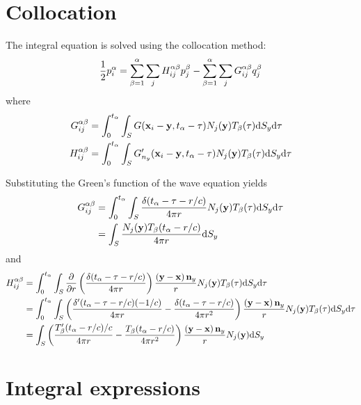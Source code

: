 \documentclass[a4paper,11pt,twoside]{article}
\newcommand{\td}{\mathrm{d}}
\begin{document}
\section{Collocation}

The integral equation is solved using the collocation method:
%
\begin{equation}
\frac{1}{2}p_{i}^{\alpha} =
\sum_{\beta = 1}^{\alpha} \sum_j 
H_{ij}^{\alpha \beta}
p^{\beta}_{j} \\
-
\sum_{\beta = 1}^{\alpha} \sum_j 
G_{ij}^{\alpha \beta}
q^{\beta}_{j} 
\end{equation}
%
where
%
\begin{align}
G_{ij}^{\alpha \beta} &=
\int_{0}^{t_{\alpha}} \int_{S}
G({\bf x}_i-{\bf y}, t_{\alpha}-\tau)
N_j({\bf y}) T_{\beta}(\tau)
\td S_{y} \td \tau
\nonumber \\
H_{ij}^{\alpha \beta} &=
\int_{0}^{t_{\alpha}} \int_{S}
G'_{n_y}({\bf x}_i-{\bf y}, t_{\alpha}-\tau)
N_j({\bf y}) T_{\beta}(\tau)
\td S_{y} \td \tau
\end{align}

Substituting the Green's function of the wave equation yields
%
\begin{align}
G_{ij}^{\alpha \beta}
&=
\int_{0}^{t_{\alpha}} \int_{S}
\frac{\delta(t_{\alpha}-\tau-r/c)}{4\pi r}
N_j({\bf y}) T_{\beta}(\tau)
\td S_{y} \td \tau
\nonumber \\
&=
\int_{S}
\frac{N_j({\bf y}) T_{\beta}(t_{\alpha}-r/c)}{4\pi r}
\td S_{y}
\end{align}
%
and
%
\begin{align}
H_{ij}^{\alpha \beta}
&=
\int_{0}^{t_{\alpha}} \int_{S}
\frac{\partial}{\partial r}\left(\frac{\delta(t_{\alpha}-\tau-r/c)}{4\pi r}\right)
\frac{\left({\bf y}-{\bf x}\right){\bf n}_y}{r}
N_j({\bf y}) T_{\beta}(\tau)
\td S_{y} \td \tau
\nonumber \\
&=
\int_{0}^{t_{\alpha}} \int_{S}
\left(
\frac{\delta'(t_{\alpha}-\tau-r/c)(-1/c)}{4\pi r}
-
\frac{\delta(t_{\alpha}-\tau-r/c)}{4\pi r^2}
\right)
\frac{\left({\bf y}-{\bf x}\right){\bf n}_y}{r}
N_j({\bf y}) T_{\beta}(\tau)
\td S_{y} \td \tau
\nonumber \\
&=
\int_{S}
\left(
\frac{T'_{\beta}(t_{\alpha}-r/c)/c}{4\pi r}
-
\frac{T_{\beta}(t_{\alpha}-r/c)}{4\pi r^2}
\right)
\frac{\left({\bf y}-{\bf x}\right){\bf n}_y}{r}
N_j({\bf y})
\td S_{y}
\end{align}
%

\section{Integral expressions}
\end{document}
